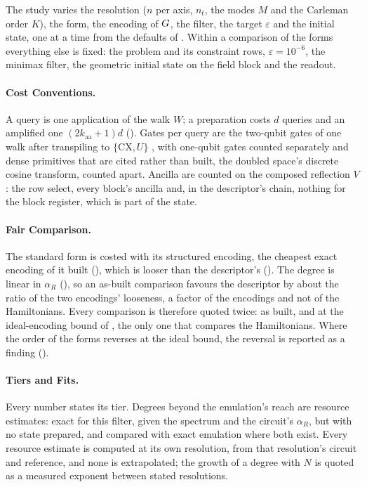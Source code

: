 The study varies the resolution ($n$ per axis, $n_t$, the modes $M$ and the Carleman order $K$), the form, the encoding of $G$, the filter, the target $\varepsilon$ and the initial state, one at a time from the defaults of . Within a comparison of the forms everything else is fixed: the problem and its constraint rows, $\varepsilon=10^{-6}$, the minimax filter, the geometric initial state on the field block and the readout.

\paragraph{Cost Conventions.} A query is one application of the walk $W$; a preparation costs $d$ queries and an amplified one $(2k_{\mathrm{aa}}+1)d$ (). Gates per query are the two-qubit gates of one walk after transpiling to $\{\mathrm{CX},U\}$ \cite{qiskit2024}, with one-qubit gates counted separately and dense primitives that are cited rather than built, the doubled space's discrete cosine transform, counted apart. Ancilla are counted on the composed reflection $V$: the row select, every block's ancilla and, in the descriptor's chain, nothing for the block register, which is part of the state.

\paragraph{Fair Comparison.} The standard form is costed with its structured encoding, the cheapest exact encoding of it built (), which is looser than the descriptor's (). The degree is linear in $\alpha_R$ (), so an as-built comparison favours the descriptor by about the ratio of the two encodings' looseness, a factor of the encodings and not of the Hamiltonians. Every comparison is therefore quoted twice: as built, and at the ideal-encoding bound of , the only one that compares the Hamiltonians. Where the order of the forms reverses at the ideal bound, the reversal is reported as a finding ().

\paragraph{Tiers and Fits.} Every number states its tier. Degrees beyond the emulation's reach are resource estimates: exact for this filter, given the spectrum and the circuit's $\alpha_R$, but with no state prepared, and compared with exact emulation where both exist. Every resource estimate is computed at its own resolution, from that resolution's circuit and reference, and none is extrapolated; the growth of a degree with $N$ is quoted as a measured exponent between stated resolutions.

